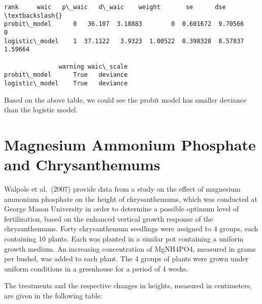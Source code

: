 \documentclass[11pt]{article}
\makeatletter
\newcommand{\boxspacing}{\kern\kvtcb@left@rule\kern\kvtcb@boxsep}
\newcommand{\prompt}[4]{
        \ttfamily\llap{{\color{#2}[#3]:\hspace{3pt}#4}}\vspace{-\baselineskip}
    }
\makeatother
\begin{document}
            \begin{tcolorbox}[breakable, size=fbox, boxrule=.5pt, pad at break*=1mm, opacityfill=0]
\prompt{Out}{outcolor}{13}{\boxspacing}
\begin{Verbatim}[commandchars=\\\{\}]
               rank     waic   p\_waic   d\_waic    weight       se      dse  \textbackslash{}
probit\_model      0   36.107  3.18883        0  0.601672  9.70566        0
logistic\_model    1  37.1122   3.9323  1.00522  0.398328  8.57837  1.59664

               warning waic\_scale
probit\_model      True   deviance
logistic\_model    True   deviance
\end{Verbatim}
\end{tcolorbox}
        
    Based on the above table, we could see the probit model has smaller
deviance than the logistic model.

    \hypertarget{magnesium-ammonium-phosphate-and-chrysanthemums}{%
\section{Magnesium Ammonium Phosphate and
Chrysanthemums}\label{magnesium-ammonium-phosphate-and-chrysanthemums}}

Walpole et al.~(2007) provide data from a study on the effect of
magnesium ammonium phosphate on the height of chrysanthemums, which was
conducted at George Mason University in order to determine a possible
optimum level of fertilization, based on the enhanced vertical growth
response of the chrysanthemums. Forty chrysanthemum seedlings were
assigned to 4 groups, each containing 10 plants. Each was planted in a
similar pot containing a uniform growth medium. An increasing
concentration of MgNH4PO4, measured in grams per bushel, was added to
each plant. The 4 groups of plants were grown under uniform conditions
in a greenhouse for a period of 4 weeks.

The treatments and the respective changes in heights, measured in
centimeters, are given in the following table:
\end{document}
